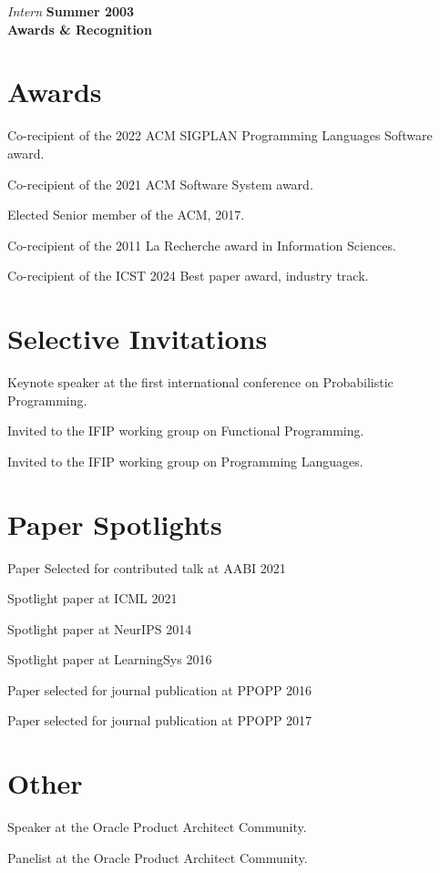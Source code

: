 \documentclass[margin,line]{res}
\begin{document}
\begin{resume}
\vspace{-.4cm}
{\em Intern} \hfill {\bf Summer 2003}\\

\newpage
{\bf {\Large Awards \& Recognition}}

\section{\sc Awards}

Co-recipient of the 2022 ACM SIGPLAN Programming Languages Software award.

Co-recipient of the 2021 ACM Software System award.

Elected Senior member of the ACM, 2017.

Co-recipient of the 2011 La Recherche award in Information Sciences.

Co-recipient of the ICST 2024 Best paper award, industry track.

\section{\sc Selective Invitations}

Keynote speaker at the first international conference on Probabilistic Programming. 

Invited to the IFIP working group on Functional Programming.

Invited to the IFIP working group on Programming Languages.

\section{\sc Paper Spotlights}

Paper Selected for contributed talk at AABI 2021

Spotlight paper at ICML 2021

Spotlight paper at NeurIPS 2014

Spotlight paper at LearningSys 2016

Paper selected for journal publication at PPOPP 2016

Paper selected for journal publication at PPOPP 2017

\section{\sc Other}

Speaker at the Oracle Product Architect Community.

Panelist at the Oracle Product Architect Community.


\end{resume}
\end{document}
